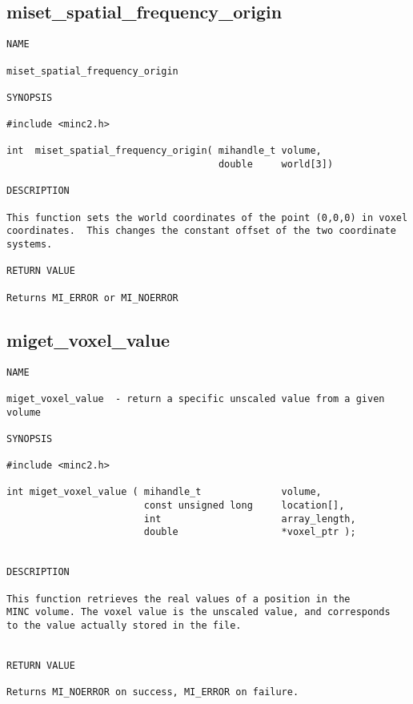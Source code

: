\documentclass{article}
\begin{document}
\subsection{miset\_spatial\_frequency\_origin}
\begin{verbatim}
NAME 

miset_spatial_frequency_origin

SYNOPSIS

#include <minc2.h>

int  miset_spatial_frequency_origin( mihandle_t volume,
                                     double     world[3])
                       
DESCRIPTION

This function sets the world coordinates of the point (0,0,0) in voxel
coordinates.  This changes the constant offset of the two coordinate
systems.

RETURN VALUE

Returns MI_ERROR or MI_NOERROR

\end{verbatim}

\subsection{miget\_voxel\_value}
\begin{verbatim}
NAME

miget_voxel_value  - return a specific unscaled value from a given volume

SYNOPSIS

#include <minc2.h>

int miget_voxel_value ( mihandle_t              volume,
                        const unsigned long     location[],
                        int                     array_length,
                        double                  *voxel_ptr );


DESCRIPTION

This function retrieves the real values of a position in the
MINC volume. The voxel value is the unscaled value, and corresponds
to the value actually stored in the file.


RETURN VALUE

Returns MI_NOERROR on success, MI_ERROR on failure.
\end{verbatim}
\end{document}
